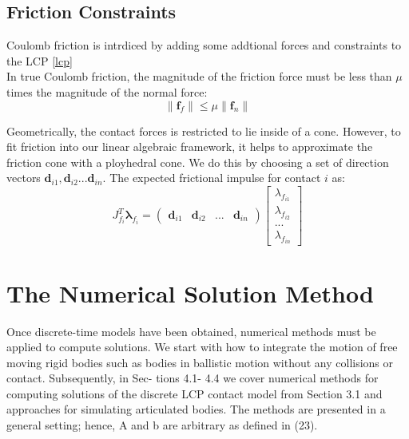     \subsection{Friction Constraints}
        Coulomb friction is intrdiced by adding some addtional forces and constraints to the LCP \ref{lcp} \\

        In true Coulomb friction, the magnitude of the friction force must be less than $\mu$ times the magnitude of the normal force:
        \begin{equation}
            \|\pmb{f}_f\| \le \mu\|\pmb{f}_n\|
        \end{equation}

        Geometrically, the contact forces is restricted to lie inside of a cone. However, to fit friction into our linear algebraic framework, it helps to approximate the friction cone with a ployhedral cone. We do this by choosing a set of direction vectors \(\pmb{d}_{i1}, \pmb{d}_{i2}...\pmb{d}_{in}\). The expected frictional impulse for contact $i$ as:
        \begin{equation}
            J_{f_i}^{T}\pmb{\lambda}_{f_i} = (\begin{array}{cccc} \pmb{d}_{i1} & \pmb{d}_{i2} & ... & \pmb{d}_{in} \end{array})\left[\begin{array}{c} \lambda_{f_{i1}} \\ \lambda_{f_{i2}} \\ ... \\ \lambda_{f_{in}}\end{array}\right]
        \end{equation}

\section{The Numerical Solution Method}
    Once discrete-time models have been obtained, numerical methods must be applied to compute solutions. We start with how to integrate the motion of free moving rigid bodies such as bodies in ballistic motion without any collisions or contact. Subsequently, in Sec- tions 4.1- 4.4 we cover numerical methods for computing solutions of the discrete LCP contact model from Section 3.1 and approaches for simulating articulated bodies. The methods are presented in a general setting; hence, A and b are arbitrary as defined in (23).
